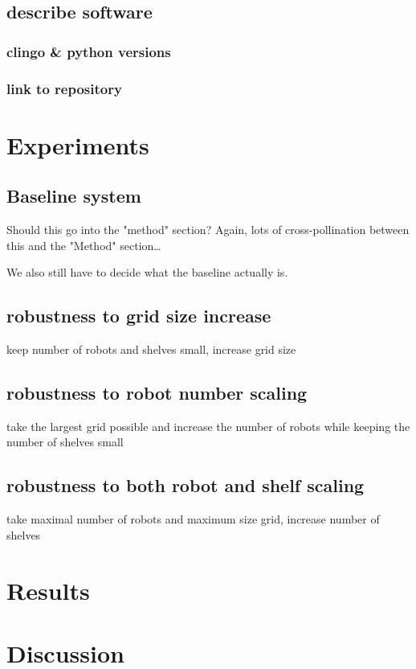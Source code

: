 \documentclass[11pt]{article}
\begin{document}
\subsection{describe software}
\label{sec:org54b790c}
\subsubsection{clingo \& python versions}
\label{sec:orgafdeea4}
\subsubsection{link to repository}
\label{sec:org1186d62}
\section{Experiments}
\label{sec:org2c68a51}
\subsection{Baseline system}
\label{sec:orgfa37f02}
Should this go into the "method" section? Again, lots of cross-pollination between this and the "Method" section\ldots{}

We also still have to decide what the baseline actually is.
\subsection{robustness to grid size increase}
\label{sec:org8de6962}
keep number of robots and shelves small, increase grid size
\subsection{robustness to robot number scaling}
\label{sec:org57fcbab}
take the largest grid possible and increase the number of robots while keeping the number of shelves small
\subsection{robustness to both robot and shelf scaling}
\label{sec:org6fbb893}
take maximal number of robots and maximum size grid, increase number of shelves
\section{Results}
\label{sec:orgc00c63b}
\section{Discussion}
\label{sec:orgc36b766}
\end{document}
